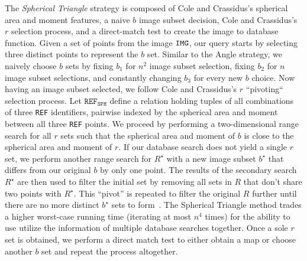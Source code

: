 
The \textit{Spherical Triangle} strategy is composed of Cole and Crassidus's spherical area and moment features, a naive $b$ image subset decision, Cole and Crassidus's $r$ selection process, and a direct-match test to create the image to database function.
Given a set of points from the image $\texttt{IMG}$, our query starts by selecting three distinct points to represent the $b$ set.
Similar to the Angle strategy, we naively choose $b$ sets by fixing $b_1$ for $n^2$ image subset selection, fixing $b_2$ for $n$ image subset selections, and constantly changing $b_3$ for every new $b$ choice.
Now having an image subset selected, we follow Cole and Crassidus's $r$ ``pivoting`` selection process.
Let $\texttt{REF}_\texttt{SPH}$ define a relation holding tuples of all combinations of three \texttt{REF} identifiers, pairwise indexed by the spherical area and moment between all three \texttt{REF} points.
We proceed by performing a two-dimensional range search for all $r$ sets such that the spherical area and moment of $b$ is close to the spherical area and moment of $r$.
If our database search does not yield a single $r$ set, we perform another range search for $R^\star$ with a new image subset $b^\star$ that differs from our original $b$ by only one point.
The results of the secondary search $R^\star$ are then used to filter the initial set by removing all sets in $R$ that don't share two points with $R^\star$.
This ``pivot'' is repeated to filter the original $R$ further until there are no more distinct $b^\star$ sets to form~\cite{coleAndCrassidis:sphericalTriangleMethod}.
The Spherical Triangle method trades a higher worst-case running time (iterating at most $n^4$ times) for the ability to use utilize the information of multiple database searches together.
Once a sole $r$ set is obtained, we perform a direct match test to either obtain a map or choose another $b$ set and repeat the process altogether.

